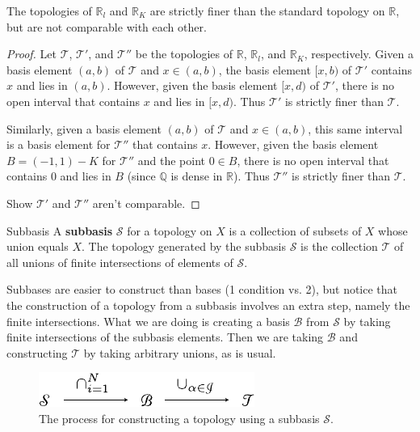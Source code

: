 \documentclass[10pt]{report}
\begin{document}
\begin{prop}
	The topologies of $\mathbb{R}_l$ and $\mathbb{R}_K$ are strictly finer than the standard topology on $\mathbb{R}$, but are not comparable with each other.
\end{prop}
\begin{proof}
	Let $\mathcal{T}$, $\mathcal{T}'$, and $\mathcal{T}''$ be the topologies of $\mathbb{R}$, $\mathbb{R}_l$, and $\mathbb{R}_K$, respectively. Given a basis element $(a,b)$ of $\mathcal{T}$ and $x \in (a,b)$, the basis element $[x,b)$ of $\mathcal{T}'$ contains $x$ and lies in $(a,b)$. However, given the basis element $[x,d)$ of $\mathcal{T}'$, there is no open interval that contains $x$ and lies in $[x,d)$. Thus $\mathcal{T}'$ is strictly finer than $\mathcal{T}$.

	Similarly, given a basis element $(a,b)$ of $\mathcal{T}$ and $x \in (a,b)$, this same interval is a basis element for $\mathcal{T}''$ that contains $x$. However, given the basis element $B=(-1,1) - K$ for $\mathcal{T}''$ and the point $0 \in B$, there is no open interval that contains $0$ and lies in $B$ (since $\mathbb{Q}$ is dense in $\mathbb{R}$). Thus $\mathcal{T}''$ is strictly finer than $\mathcal{T}$.

	{\color{red}Show $\mathcal{T}'$ and $\mathcal{T}''$ aren't comparable.}
\end{proof}

\begin{defn}{Subbasis}{}
	A \textbf{subbasis} $\mathcal{S}$ for a topology on $X$ is a collection of subsets of $X$ whose union equals $X$. The topology generated by the subbasis $\mathcal{S}$ is the collection $\mathcal{T}$ of all unions of finite intersections of elements of $\mathcal{S}$.
\end{defn}

Subbases are easier to construct than bases (1 condition vs. 2), but notice that the construction of a topology from a subbasis involves an extra step, namely the finite intersections. What we are doing is creating a basis $\mathcal{B}$ from $\mathcal{S}$ by taking finite intersections of the subbasis elements. Then we are taking $\mathcal{B}$ and constructing $\mathcal{T}$ by taking arbitrary unions, as is usual.

\begin{figure}[H]
	\centering
	\includegraphics[scale=1]{fig/subbasis-to-topology.pdf}
	\caption{The process for constructing a topology using a subbasis $\mathcal{S}$.}
\end{figure}
\end{document}
